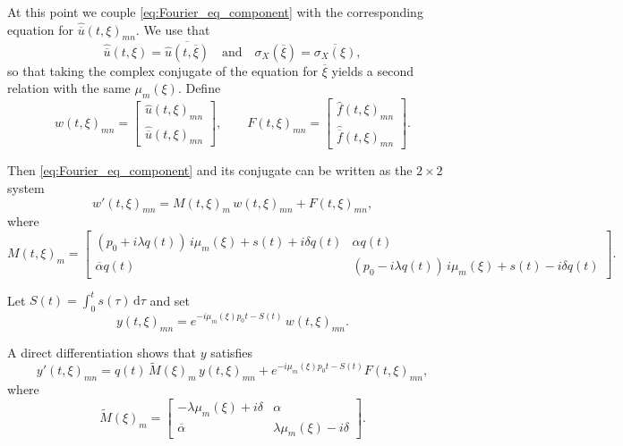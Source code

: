 \documentclass[11pt,reqno]{amsart}
\numberwithin{equation}{section}
\begin{document}
At this point we couple \eqref{eq:Fourier_eq_component} with the corresponding equation for $\widehat{\overline u}(t,\xi)_{mn}$. We use that
\[
\widehat{\overline u}(t,\xi)=\overline{\widehat{u}(t,\overline\xi)}
\quad\text{and}\quad
\sigma_X(\overline\xi)=\overline{\sigma_X(\xi)},
\]
so that taking the complex conjugate of the equation for $\overline\xi$ yields a second relation with the same $\mu_m(\xi)$. Define
\[
w(t,\xi)_{mn}=
\begin{bmatrix}
	\widehat u(t,\xi)_{mn}\\[1mm]
	\widehat{\overline u}(t,\xi)_{mn}
\end{bmatrix},
\qquad
F(t,\xi)_{mn}=
\begin{bmatrix}
	\widehat f(t,\xi)_{mn}\\[1mm]
	\widehat{\overline f}(t,\xi)_{mn}
\end{bmatrix}.
\]

Then \eqref{eq:Fourier_eq_component} and its conjugate can be written as the $2\times2$ system
\begin{equation*}\label{eq:w_system_detailed}
	w'(t,\xi)_{mn}=M(t,\xi)_m\,w(t,\xi)_{mn}+F(t,\xi)_{mn},
\end{equation*}
where
\[
M(t,\xi)_m=
\begin{bmatrix}
	(p_0+i\lambda q(t))\,i\mu_m(\xi)+s(t)+i\delta q(t) & \alpha q(t)\\
	\overline\alpha q(t) & (p_0-i\lambda q(t))\,i\mu_m(\xi)+s(t)-i\delta q(t)
\end{bmatrix}.
\]

 Let $S(t)=\int_0^t s(\tau)\,\mathrm{d}\tau$ and set
\begin{equation}\label{eq:change_y}
	y(t,\xi)_{mn}=e^{-i\mu_m(\xi)p_0 t-S(t)}\,w(t,\xi)_{mn}.
\end{equation}

A direct differentiation shows that $y$ satisfies
\begin{equation}\label{eq:y_system_detailed}
	y'(t,\xi)_{mn}=q(t)\,\widetilde M(\xi)_m\,y(t,\xi)_{mn}+e^{-i\mu_m(\xi)p_0 t-S(t)}F(t,\xi)_{mn},
\end{equation}
where
\begin{equation*}\label{eq:Mtilde_def}
	\widetilde M(\xi)_m=
	\begin{bmatrix}
		-\lambda \mu_m(\xi)+i\delta & \alpha\\
		\overline\alpha & \lambda \mu_m(\xi)-i\delta
	\end{bmatrix}.
\end{equation*}
\end{document}
